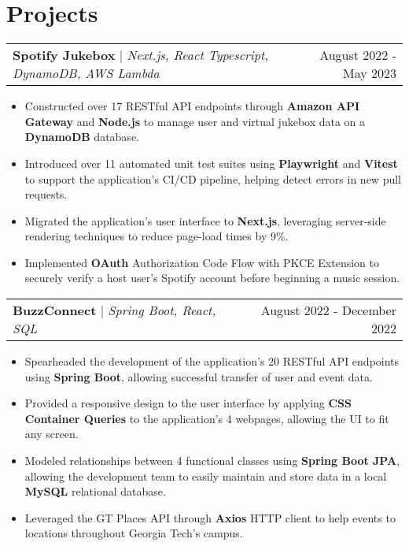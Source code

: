 \documentclass[letterpaper,11pt]{article}
\makeatletter
\newcommand{\resumeProjectHeading}[3]{
    \begin{tabular*}{0.97\textwidth}[t]{l@{\extracolsep{\fill}}r}
      \textbf{#1} $\vert$ \textit{#2}  & {#3}
    \end{tabular*}\vspace{-3pt}
}
\newcommand{\resumeItemListStart}{\begin{itemize}[noitemsep]\vspace{-4pt}}
\newcommand{\resumeItemListEnd}{\end{itemize}}
\makeatother
\begin{document}
\section{Projects}
    \resumeProjectHeading{Spotify Jukebox}{Next.js, React Typescript, DynamoDB, AWS Lambda }{August 2022 - May 2023}
      \resumeItemListStart
        \item {Constructed over 17 RESTful API endpoints through \textbf{Amazon API Gateway} and \textbf{Node.js} to manage user and virtual jukebox data on a \textbf{DynamoDB} database.}
        \item {Introduced over 11 automated unit test suites using \textbf{Playwright} and \textbf{Vitest} to support the application's CI/CD pipeline, helping detect errors in new pull requests.}
        \item {Migrated the application's user interface to \textbf{Next.js}, leveraging server-side rendering techniques to reduce page-load times by 9\%.}
        \item {Implemented \textbf{OAuth} Authorization Code Flow with PKCE Extension to securely verify a host user's Spotify account before beginning a music session.}
      \resumeItemListEnd

    \resumeProjectHeading{BuzzConnect}{Spring Boot, React, SQL}{August 2022 - December 2022}
      \resumeItemListStart
        \item {Spearheaded the development of the application's 20 RESTful API endpoints using \textbf{Spring Boot},  allowing successful transfer of user and event data.}
        \item {Provided a responsive design to the user interface by applying \textbf{CSS Container Queries} to the application's 4 webpages, allowing the UI to fit any screen.}
        \item {Modeled relationships between 4 functional classes using \textbf{Spring Boot JPA}, allowing the development team to easily maintain and store data in a local \textbf{MySQL} relational database.}
        \item {Leveraged the GT Places API through \textbf{Axios} HTTP client to help events to locations throughout Georgia Tech's campus.}
      \resumeItemListEnd

\end{document}
